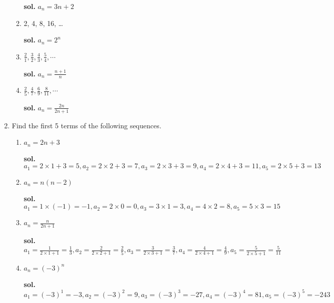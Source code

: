 \documentclass{report}
\begin{document}
\begin{multicols}{2}
\begin{enumerate}
\begin{enumerate}
                  \textbf{sol{}.} $a_{n} = 3n+2$

            \item 2, 4, 8, 16, \ldots

                  \textbf{sol{}.} $a_{n} = 2^{n}$

            \item $\frac{2}{1}, \frac{3}{2}, \frac{4}{3}, \frac{5}{4}, \cdots$

                  \textbf{sol{}.} $a_{n} = \frac{n+1}{n}$

            \item $\frac{2}{5}, \frac{4}{7}, \frac{6}{9}, \frac{8}{11}, \cdots$

                  \textbf{sol{}.} $a_{n} = \frac{2n}{2n+1}$
          \end{enumerate}

    \item Find the first 5 terms of the following sequences.

          \begin{enumerate}
            \item $a_{n} = 2n+3$

                  \textbf{sol{}.}
                  $a_{1} = 2\times1+3 = 5, a_{2} = 2\times2+3 = 7, a_{3} = 2\times3+3 = 9, a_{4}
                    = 2\times4+3 = 11, a_{5} = 2\times5+3 = 13$

            \item $a_{n} = n(n-2)$

                  \textbf{sol{}.}
                  $a_{1} = 1\times(-1) = -1, a_{2} = 2\times0 = 0, a_{3} = 3\times1 = 3, a_{4}
                    = 4\times2 = 8, a_{5} = 5\times3 = 15$

            \item $a_{n} = \frac{n}{2n+1}$

                  \textbf{sol{}.}
                  $a_{1} = \frac{1}{2\times1+1}= \frac{1}{3}, a_{2} = \frac{2}{2\times2+1}= \frac{2}{5}
                    , a_{3} = \frac{3}{2\times3+1}= \frac{3}{7}, a_{4} = \frac{4}{2\times4+1}=
                    \frac{4}{9}, a_{5} = \frac{5}{2\times5+1}= \frac{5}{11}$

            \item $a_{n} = {{(-3)}}^{n}$

                  \textbf{sol{}.}
                  $a_{1} = {(-3)}^{1} = -3, a_{2} = {(-3)}^{2} = 9, a_{3} = {(-3)}^{3} = -27, a_{4}
                      = {(-3)}^{4} = 81, a_{5} = {(-3)}^{5} = -243$
          \end{enumerate}


\end{enumerate}
\end{multicols}
\end{document}

